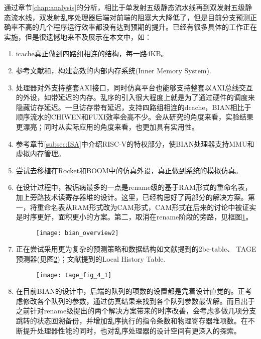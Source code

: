 通过章节\ref{chap:analysis}的分析，相比于单发射五级静态流水线再到双发射五级静态流水线，双发射乱序处理器后端对前端的阻塞大大降低了，但是目前分支预测正确率不高的几个程序运行效率都没有达到预期的提升。已经有很多具体的工作正在实施，但是很遗憾地来不及展示在本文中，如：
\begin{enumerate}[label=(\arabic*)]
	\item icache真正做到四路组相连的结构，每一路4KB。
	\item 参考文献\cite{Alpha21264}和\cite{MIPS1996}，构建高效的内部内存系统(Inner Memory System).
	\item 处理器对外支持整套AXI接口，同时仿真平台也能够支持整套以AXI总线交互的外设，如带延迟的内存。乱序的引入很大程度上就是为了通过硬件的调度来隐藏访存延迟。一旦访存带有延迟，支持四路组相连的dcache，BIAN相比于顺序流水的CHIWEN和FUXI效率会高不少。会从研究的角度来看，实验结果更漂亮；同时从实际应用的角度来看，也更加具有实用性。
	\item 参考章节\ref{subsec:ISA}中介绍RISC-V的特权部分，使BIAN处理器支持MMU和虚拟内存管理。
	\item 尝试去移植在Rocket和BOOM中的仿真外设，真正做到系统的模拟仿真。
	\item 在设计过程中，被诟病最多的一点是rename级的基于RAM形式的重命名表，加上旁路技术读寄存器堆的设计。这里，已经构思好了两部分的解决方案。第一，将重命名表从RAM形式改为CAM形式，CAM形式在后来的讨论中被证实是时序更好，面积更小的方案。第二，取消在rename阶段的旁路，见框图\ref{fig:bian_over2}。
	\begin{figure}[!htbp]
		\centering
		\texttt{[image: bian\_overview2]}
		\label{fig:bian_over2}
	\end{figure}
	\item 正在尝试采用更为复杂的预测策略和数据结构如文献\cite{Celio:EECS-2018-151}提到的2bc-table、 TAGE预测器(见图\ref{fig:TAGE})；文献\cite{Alpha21264}提到的Local History Table.
	\begin{figure}[!htbp]
		\centering
		\texttt{[image: tage\_fig\_4\_1]}
		\label{fig:TAGE}
	\end{figure}
	\item 在目前BIAN的设计中，后端的队列的项数的设置都是凭着设计直觉的。正考虑修改各个队列的参数，通过仿真结果来找到各个队列参数最优解。而且出于之前针对rename级提出的两个解决方案带来的时序改善，会考虑多做几项分支跳转的状态回溯备份，并增加乱序执行的指令条数和物理寄存器堆项数。在不断提升处理器性能的同时，也对乱序处理器的设计空间有更深入的探索。
\end{enumerate}
	
